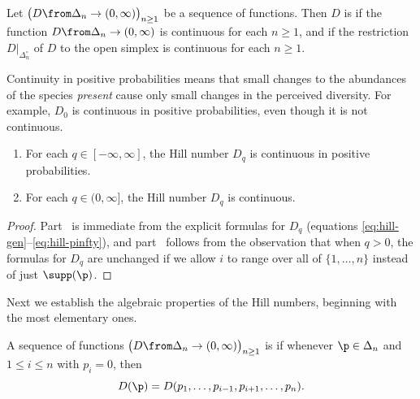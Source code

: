 \begin{defn}
Let $\bigl(D\from \Delta_n \to (0, \infty)\bigr)_{n \geq 1}$ be a sequence
of functions.  Then $D$ is 
%
%
% 
if the function $D \from \Delta_n \to (0, \infty)$ is continuous for each
$n \geq 1$, and  if the restriction $D|_{\Delta_n^\circ}$ of $D$
to the open simplex is continuous for each $n \geq 1$.
\end{defn}

Continuity in positive probabilities means that small changes to the
abundances of the species \emph{present} cause only small changes in the
perceived diversity.  For example, $D_0$ is continuous in positive
probabilities, even though it is not continuous.

\begin{lemma}
% 
\begin{enumerate}
\item 
{}
For each $q \in [-\infty, \infty]$, the Hill number $D_q$ is continuous in
positive probabilities.

\item
{} 
For each $q \in (0, \infty]$, the Hill number $D_q$ is continuous.
\end{enumerate}
\end{lemma}

\begin{proof}
Part~ is immediate from the explicit formulas for
$D_q$ (equations \eqref{eq:hill-gen}--\eqref{eq:hill-pinfty}), and
part~ follows from the observation that when $q >
0$, the formulas for $D_q$ are unchanged if we allow $i$ to range over all
of $\{1, \ldots, n\}$ instead of just $\supp(\p)$.
\end{proof}

Next we establish the algebraic properties of the Hill numbers, beginning
with the most elementary ones.  

\begin{defn}
A sequence of functions $\bigl(D\from \Delta_n \to (0, \infty)\bigr)_{n
  \geq 1}$ is %
%
% 
if whenever $\p \in \Delta_n$ and $1 \leq i \leq n$ with $p_i = 0$, then
\[
D(\p) = D(p_1, \ldots, p_{i - 1}, p_{i + 1}, \ldots, p_n).
\]
\end{defn}

